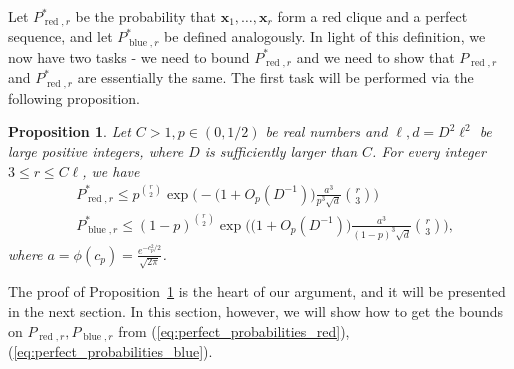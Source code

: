 \documentclass[11pt]{amsart}
\newtheorem{proposition}[theorem]{\bf Proposition}
\theoremstyle{definition}
\def\bx{\boldsymbol{x}}
\DeclareMathOperator{\red}{red}
\DeclareMathOperator{\blue}{blue}
\begin{document}
Let $P_{\red, r}^*$ be the probability that $\bx_1, \dots, \bx_r$ form a red clique and a perfect sequence, and let $P_{\blue, r}^*$ be defined analogously.
In light of this definition, we now have two tasks - we need to bound $P_{\red, r}^*$ and we need to show that $P_{\red, r}$ and $P_{\red, r}^*$ are essentially the same. The first task will be performed via the following proposition.

\begin{proposition}\label{prop:perfect_probabilities}
Let $C>1, p\in (0, 1/2)$ be real numbers and $\ell, d=D^2\ell^2$ be large positive integers, where $D$ is sufficiently larger than $C$. For every integer $3\leq r\leq C\ell$, we have
{\smaller[0.3]
\begin{align}
    &P_{\red, r}^*\leq p^{\binom{r}{2}}\exp\bigg(-\big(1+O_p(D^{-1})\big)\frac{a^3}{p^3\sqrt{d}}\binom{r}{3}\bigg)\label{eq:perfect_probabilities_red}\\
    &P_{\blue, r}^*\leq (1-p)^{\binom{r}{2}}\exp\bigg(\big(1+O_p(D^{-1})\big)\frac{a^3}{(1-p)^3\sqrt{d}}\binom{r}{3}\bigg),\label{eq:perfect_probabilities_blue}
\end{align}
}
where $a=\phi(c_p)=\frac{e^{-c_p^2/2}}{\sqrt{2\pi}}$.
\end{proposition}

The proof of Proposition~\ref{prop:perfect_probabilities} is the heart of our argument, and it will be presented in the next section. In this section, however, we will show how to get the bounds on $P_{\red, r}, P_{\blue, r}$ from (\ref{eq:perfect_probabilities_red}), (\ref{eq:perfect_probabilities_blue}).
\end{document}
